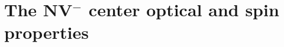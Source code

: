 \documentclass[a4paper, 11pt]{report}
\begin{document}
%
%
%
%
%

\section{The NV$^-$ center optical and spin properties}
\end{document}

